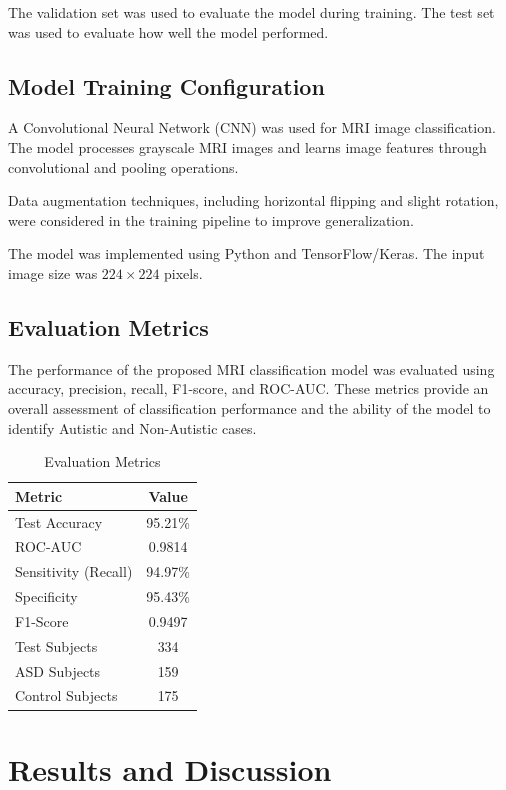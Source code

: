 \documentclass[conference]{IEEEtran}
\begin{document}
The validation set was used to evaluate the model during training. The test set was used to evaluate how well the model performed.

\subsection{Model Training Configuration}
A Convolutional Neural Network (CNN) was used for MRI image classification. The model processes grayscale MRI images and learns image features through convolutional and pooling operations.

Data augmentation techniques, including horizontal flipping and slight rotation, were considered in the training pipeline to improve generalization.

The model was implemented using Python and TensorFlow/Keras. The input image size was $224 \times 224$ pixels.

\subsection{Evaluation Metrics}
The performance of the proposed MRI classification model was evaluated using accuracy, precision, recall, F1-score, and ROC-AUC. These metrics provide an overall assessment of classification performance and the ability of the model to identify Autistic and Non-Autistic cases.

\begin{table}[h]
\centering
\caption{Evaluation Metrics}
\label{tab:metrics}
\begin{tabular}{lc}
\toprule
\textbf{Metric} & \textbf{Value} \\
\midrule
Test Accuracy & 95.21\% \\
ROC-AUC & 0.9814 \\
Sensitivity (Recall) & 94.97\% \\
Specificity & 95.43\% \\
F1-Score & 0.9497 \\
Test Subjects & 334 \\
ASD Subjects & 159 \\
Control Subjects & 175 \\
\bottomrule
\end{tabular}
\end{table}

\section{Results and Discussion}
\end{document}
